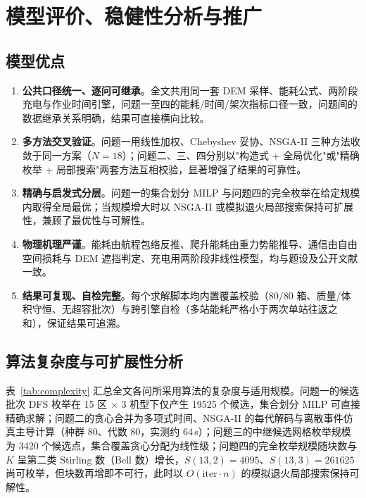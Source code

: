 \section{模型评价、稳健性分析与推广}

\subsection{模型优点}

\begin{enumerate}
    \item \textbf{公共口径统一、逐问可继承}。全文共用同一套 DEM 采样、能耗公式、两阶段充电与作业时间引擎，问题一至四的能耗/时间/架次指标口径一致，问题间的数据继承关系明确，结果可直接横向比较。
    \item \textbf{多方法交叉验证}。问题一用线性加权、Chebyshev 妥协、NSGA-II 三种方法收敛于同一方案（$N=18$）；问题二、三、四分别以"构造式 + 全局优化"或"精确枚举 + 局部搜索"两套方法互相校验，显著增强了结果的可靠性。
    \item \textbf{精确与启发式分层}。问题一的集合划分 MILP 与问题四的完全枚举在给定规模内取得全局最优；当规模增大时以 NSGA-II 或模拟退火局部搜索保持可扩展性，兼顾了最优性与可解性。
    \item \textbf{物理机理严谨}。能耗由航程包络反推、爬升能耗由重力势能推导、通信由自由空间损耗与 DEM 遮挡判定、充电用两阶段非线性模型，均与题设及公开文献\cite{ref_zhang,ref_itu,ref_ti}一致。
    \item \textbf{结果可复现、自检完整}。每个求解脚本均内置覆盖校验（80/80 箱、质量/体积守恒、无超容批次）与跨引擎自检（多站能耗严格小于两次单站往返之和），保证结果可追溯。
\end{enumerate}

\subsection{算法复杂度与可扩展性分析}

表~\ref{tab:complexity} 汇总全文各问所采用算法的复杂度与适用规模。问题一的候选批次 DFS 枚举在 15 区 $\times$ 3 机型下仅产生 19525 个候选，集合划分 MILP 可直接精确求解；问题二的贪心合并为多项式时间、NSGA-II 的每代解码与离散事件仿真主导计算（种群 80、代数 80，实测约 64\,s）；问题三的中继候选网格枚举规模为 3420 个候选点，集合覆盖贪心分配为线性级；问题四的完全枚举规模随块数与 $K$ 呈第二类 Stirling 数（Bell 数）增长，$S(13,2)=4095$、$S(13,3)=261625$ 尚可枚举，但块数再增即不可行，此时以 $O(\text{iter}\cdot n)$ 的模拟退火局部搜索保持可解性。

